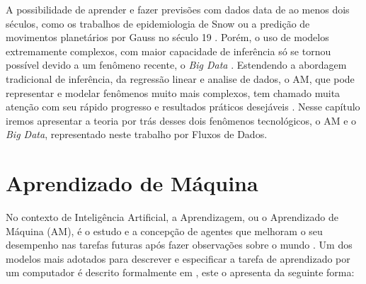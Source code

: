 \newcommand{\texCommand}[1]{\texttt{\textbackslash{#1}}}%

\newcommand{\exemplo}[1]{%
\vspace{\baselineskip}%
\noindent\fbox{\begin{minipage}{\textwidth}#1\end{minipage}}%
\\\vspace{\baselineskip}}%

\newcommand{\exemploVerbatim}[1]{%
\vspace{\baselineskip}%
\noindent\fbox{\begin{minipage}{\textwidth}%
#1\end{minipage}}%
\\\vspace{\baselineskip}}%
\label{chap:aprendizado}
A possibilidade de aprender e fazer previsões com dados data de ao menos dois séculos, como os trabalhos de epidemiologia de Snow ou a predição de movimentos planetários por Gauss no século 19 \cite{vinten2003cholera,stigler1986history,russell2016artificial}. Porém, o uso de modelos extremamente complexos, com maior capacidade de inferência só se tornou possível devido a um fenômeno recente, o \textit{Big Data} \cite{mcafee2012big,halevy2009unreasonable}.
Estendendo a abordagem tradicional de inferência, da regressão linear e analise de dados, o AM, que pode representar e modelar fenômenos muito mais complexos, tem chamado muita atenção com seu rápido progresso e resultados práticos desejáveis \cite{openai2019dota,gibney2016google}. Nesse capítulo iremos apresentar a teoria por trás desses dois fenômenos tecnológicos, o AM e o \textit{Big Data}, representado neste trabalho por Fluxos de Dados.


\section{Aprendizado de Máquina}
\label{sec:aprendizado-de-maquina}

No contexto de Inteligência Artificial, a Aprendizagem, ou o Aprendizado
de Máquina (AM), é o estudo e a concepção de agentes que melhoram o seu
desempenho nas tarefas futuras após fazer observações sobre o mundo
\cite{russell2016artificial, mohri2018foundations}. Um dos modelos mais adotados
para descrever e especificar a tarefa de aprendizado por um computador é
descrito formalmente em \cite{mitchell1997machine}, este o apresenta da seguinte
forma:

